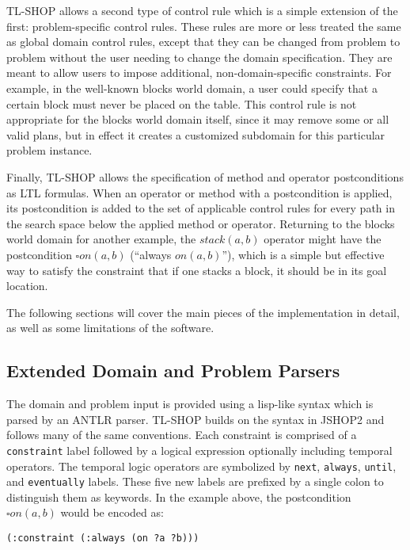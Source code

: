 \documentclass[12pt]{article}
\begin{document}
TL-SHOP allows a second type of control rule which is a simple extension of the 
first: problem-specific control rules. These rules are more or less treated the 
same as global domain control rules, except that they can be changed from 
problem to problem without the user needing to change the domain specification. 
They are meant to allow users to impose additional, non-domain-specific 
constraints. For example, in the well-known blocks world domain, a user could 
specify that a certain block must never be placed on the table. This control 
rule is not appropriate for the blocks world domain itself, since it may remove 
some or all valid plans, but in effect it creates a customized subdomain for 
this particular problem instance.

Finally, TL-SHOP allows the specification of method and operator postconditions 
as LTL formulas. When an operator or method with a postcondition is applied, 
its postcondition is added to the set of applicable control rules for every 
path in the search space below the applied method or operator. Returning to the 
blocks world domain for another example, the $stack(a, b)$ operator might have 
the postcondition $\square on(a, b)$ (``always $on(a, b)$''), which is a simple 
but effective way to satisfy the constraint that if one stacks a block, it 
should be in its goal location.

The following sections will cover the main pieces of the implementation in 
detail, as well as some limitations of the software.

\subsection{Extended Domain and Problem Parsers}
The domain and problem input is provided using a lisp-like syntax which is 
parsed by an ANTLR parser. TL-SHOP builds on the syntax in JSHOP2 and follows 
many of the same conventions. Each constraint is comprised of a 
\texttt{constraint} label followed by a logical expression optionally including 
temporal operators. The temporal logic operators are symbolized by 
\texttt{next}, \texttt{always}, \texttt{until}, and \texttt{eventually} labels. 
These five new labels are prefixed by a single colon to distinguish them as 
keywords. In the example above, the postcondition $\square on(a, b)$ would be 
encoded as:

\begin{verbatim}
(:constraint (:always (on ?a ?b)))
\end{verbatim}
\end{document}
